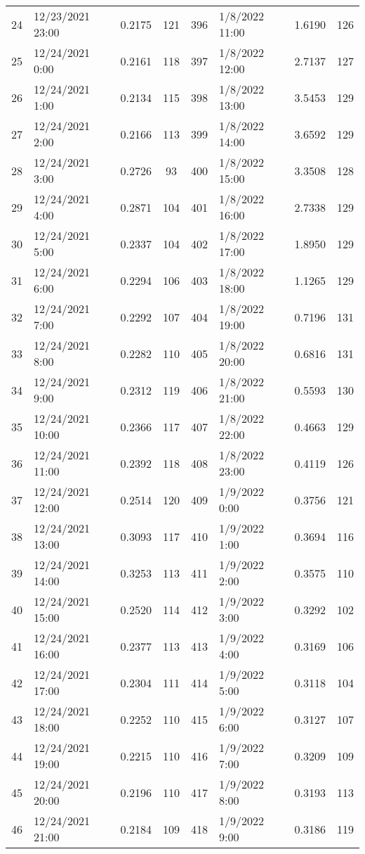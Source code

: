 \begin{center}
\begin{longtable}{llccllcc}
    24&12/23/2021  23:00&0.2175&121&396&1/8/2022 11:00	    &1.6190&126 \\
    25&12/24/2021  0:00	   &0.2161&118&397&1/8/2022 12:00	    &2.7137&127 \\
    26&12/24/2021  1:00	   &0.2134&115&398&1/8/2022 13:00	    &3.5453&129 \\
    27&12/24/2021  2:00	   &0.2166&113&399&1/8/2022 14:00	    &3.6592&129 \\
    28&12/24/2021  3:00	   &0.2726&93 &400&1/8/2022 15:00	    &3.3508&128 \\
    29&12/24/2021  4:00	   &0.2871&104&401&1/8/2022 16:00	    &2.7338&129 \\
    30&12/24/2021  5:00	   &0.2337&104&402&1/8/2022 17:00	    &1.8950&129 \\
    31&12/24/2021  6:00	   &0.2294&106&403&1/8/2022 18:00	    &1.1265&129 \\
    32&12/24/2021  7:00	   &0.2292&107&404&1/8/2022 19:00	    &0.7196&131 \\
    33&12/24/2021  8:00	   &0.2282&110&405&1/8/2022 20:00	    &0.6816&131 \\
    34&12/24/2021  9:00	   &0.2312&119&406&1/8/2022 21:00	    &0.5593&130 \\
    35&12/24/2021  10:00&0.2366&117&407&1/8/2022 22:00	    &0.4663&129 \\
    36&12/24/2021  11:00&0.2392&118&408&1/8/2022 23:00	    &0.4119&126 \\
    37&12/24/2021  12:00&0.2514&120&409&1/9/2022 0:00	    &0.3756&121 \\
    38&12/24/2021  13:00&0.3093&117&410&1/9/2022 1:00	    &0.3694&116 \\
    39&12/24/2021  14:00&0.3253&113&411&1/9/2022 2:00	    &0.3575&110 \\
    40&12/24/2021  15:00&0.2520&114&412&1/9/2022 3:00	    &0.3292&102 \\
    41&12/24/2021  16:00&0.2377&113&413&1/9/2022 4:00	    &0.3169&106 \\
    42&12/24/2021  17:00&0.2304&111&414&1/9/2022 5:00	    &0.3118&104 \\
    43&12/24/2021  18:00&0.2252&110&415&1/9/2022 6:00	    &0.3127&107 \\
    44&12/24/2021  19:00&0.2215&110&416&1/9/2022 7:00	    &0.3209&109 \\
    45&12/24/2021  20:00&0.2196&110&417&1/9/2022 8:00	    &0.3193&113 \\
    46&12/24/2021  21:00&0.2184&109&418&1/9/2022 9:00	    &0.3186&119 \\

\end{longtable}
\end{center}
